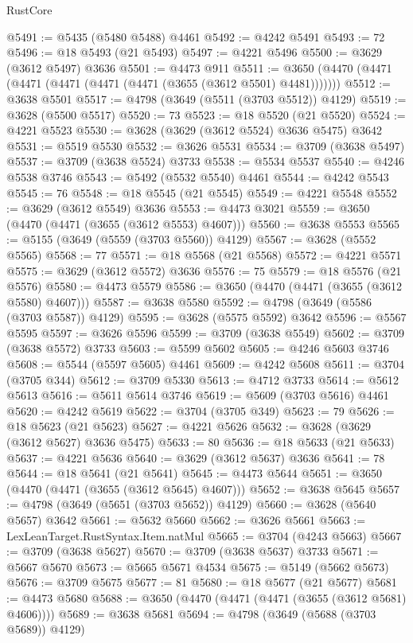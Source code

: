 \begin{lexlean}{RustCore}
\begin{coremodule}
@5491 := @5435 (@5480 @5488) @4461
@5492 := @4242 @5491
@5493 := 72
@5496 := @18 @5493 (@21 @5493)
@5497 := @4221 @5496
@5500 := @3629 (@3612 @5497) @3636
@5501 := @4473 @911
@5511 := @3650 (@4470 (@4471 (@4471 (@4471 (@4471 (@4471 (@3655 (@3612 @5501) @4481)))))))
@5512 := @3638 @5501
@5517 := @4798 (@3649 (@5511 (@3703 @5512)) @4129)
@5519 := @3628 (@5500 @5517)
@5520 := 73
@5523 := @18 @5520 (@21 @5520)
@5524 := @4221 @5523
@5530 := @3628 (@3629 (@3612 @5524) @3636 @5475) @3642
@5531 := @5519 @5530
@5532 := @3626 @5531
@5534 := @3709 (@3638 @5497)
@5537 := @3709 (@3638 @5524) @3733
@5538 := @5534 @5537
@5540 := @4246 @5538 @3746
@5543 := @5492 (@5532 @5540) @4461
@5544 := @4242 @5543
@5545 := 76
@5548 := @18 @5545 (@21 @5545)
@5549 := @4221 @5548
@5552 := @3629 (@3612 @5549) @3636
@5553 := @4473 @3021
@5559 := @3650 (@4470 (@4471 (@3655 (@3612 @5553) @4607)))
@5560 := @3638 @5553
@5565 := @5155 (@3649 (@5559 (@3703 @5560)) @4129)
@5567 := @3628 (@5552 @5565)
@5568 := 77
@5571 := @18 @5568 (@21 @5568)
@5572 := @4221 @5571
@5575 := @3629 (@3612 @5572) @3636
@5576 := 75
@5579 := @18 @5576 (@21 @5576)
@5580 := @4473 @5579
@5586 := @3650 (@4470 (@4471 (@3655 (@3612 @5580) @4607)))
@5587 := @3638 @5580
@5592 := @4798 (@3649 (@5586 (@3703 @5587)) @4129)
@5595 := @3628 (@5575 @5592) @3642
@5596 := @5567 @5595
@5597 := @3626 @5596
@5599 := @3709 (@3638 @5549)
@5602 := @3709 (@3638 @5572) @3733
@5603 := @5599 @5602
@5605 := @4246 @5603 @3746
@5608 := @5544 (@5597 @5605) @4461
@5609 := @4242 @5608
@5611 := @3704 (@3705 @344)
@5612 := @3709 @5330
@5613 := @4712 @3733
@5614 := @5612 @5613
@5616 := @5611 @5614 @3746
@5619 := @5609 (@3703 @5616) @4461
@5620 := @4242 @5619
@5622 := @3704 (@3705 @349)
@5623 := 79
@5626 := @18 @5623 (@21 @5623)
@5627 := @4221 @5626
@5632 := @3628 (@3629 (@3612 @5627) @3636 @5475)
@5633 := 80
@5636 := @18 @5633 (@21 @5633)
@5637 := @4221 @5636
@5640 := @3629 (@3612 @5637) @3636
@5641 := 78
@5644 := @18 @5641 (@21 @5641)
@5645 := @4473 @5644
@5651 := @3650 (@4470 (@4471 (@3655 (@3612 @5645) @4607)))
@5652 := @3638 @5645
@5657 := @4798 (@3649 (@5651 (@3703 @5652)) @4129)
@5660 := @3628 (@5640 @5657) @3642
@5661 := @5632 @5660
@5662 := @3626 @5661
@5663 := LexLeanTarget.RustSyntax.Item.natMul
@5665 := @3704 (@4243 @5663)
@5667 := @3709 (@3638 @5627)
@5670 := @3709 (@3638 @5637) @3733
@5671 := @5667 @5670
@5673 := @5665 @5671 @4534
@5675 := @5149 (@5662 @5673)
@5676 := @3709 @5675
@5677 := 81
@5680 := @18 @5677 (@21 @5677)
@5681 := @4473 @5680
@5688 := @3650 (@4470 (@4471 (@4471 (@3655 (@3612 @5681) @4606))))
@5689 := @3638 @5681
@5694 := @4798 (@3649 (@5688 (@3703 @5689)) @4129)

\end{coremodule}
\end{lexlean}

